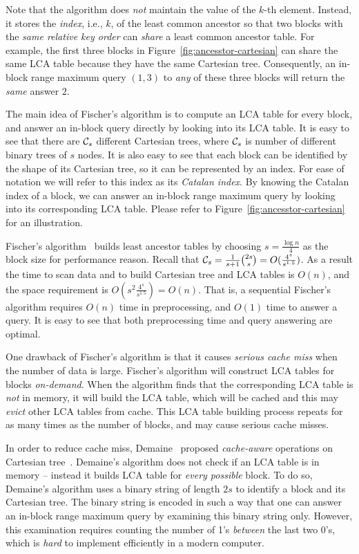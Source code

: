 Note that the algorithm does {\em not} maintain the value of the $k$-th
element.  Instead, it stores the {\em index}, i.e., $k$, of the least
common ancestor so that two blocks with the {\em same relative key
order} can {\em share} a least common ancestor table.  For example, the
first three blocks in Figure~\ref{fig:ancesstor-cartesian} can share the
same LCA table because they have the same Cartesian tree.  Consequently,
an in-block range maximum query $(1, 3)$ to {\em any} of these three
blocks will return the {\em same} answer $2$.

The main idea of Fischer's algorithm is to compute an LCA table for
every block, and answer an in-block query directly by looking into its
LCA table.  It is easy to see that there are ${\cal C}_s$ different Cartesian
trees, where ${\cal C}_s$ is number of different binary trees of $s$ nodes. It
is also easy to see that each block can be identified by the shape of
its Cartesian tree, so it can be represented by an index.  For ease of
notation we will refer to this index as its {\em Catalan index}. By
knowing the Catalan index of a block, we can answer an in-block range
maximum query by looking into its corresponding LCA table. Please refer
to Figure~\ref{fig:ancesstor-cartesian} for an illustration.

Fischer's algorithm~\cite{Fischer2006TheoreticalAP} builds least
ancestor tables by choosing $s = \frac{\log n}{4}$ as the block size for
performance reason.  Recall that ${\cal C}_s =
\frac{1}{s+1}\binom{2s}{s} = O(\frac{4^s}{s^{1.5}})$.  As a result the
time to scan data and to build Cartesian tree and LCA tables is $O(n)$,
and the space requirement is $O(s^2 \frac{4^s}{s^{1.5}}) = O(n)$.  That
is, a sequential Fischer's algorithm requires $O(n)$ time in
preprocessing, and $O(1)$ time to answer a query.  It is easy to see
that both preprocessing time and query answering are optimal.

One drawback of Fischer's algorithm is that it causes {\em serious
  cache miss} when the number of data is large.  Fischer's algorithm
will construct LCA tables for blocks {\em on-demand}.  When the
algorithm finds that the corresponding LCA table is {\em not} in
memory, it will build the LCA table, which will be cached and this may
{\em evict} other LCA tables from cache.  This LCA table building
process repeats for as many times as the number of blocks, and may
cause serious cache misses.

In order to reduce cache miss, Demaine~\cite{Demaine2009OnCT} proposed
{\em cache-aware} operations on Cartesian
tree~\cite{Vuillemin1980AUL}.  Demaine's algorithm does not check if
an LCA table is in memory -- instead it builds LCA table for {\em
  every possible} block.  To do so, Demaine's algorithm uses a binary
string of length $2s$ to identify a block and its Cartesian tree.  The
binary string is encoded in such a way that one can answer an in-block
range maximum query by examining this binary string only.  However,
this examination requires counting the number of 1's {\em between} the
last two 0's, which is {\em hard} to implement efficiently in a modern
computer.

